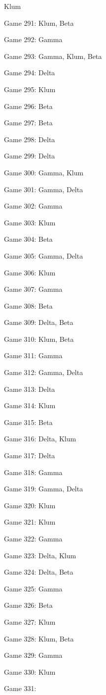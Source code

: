 \documentclass{article}
\begin{document}
\begin{multicols}{3}
\begin{compactitem}
Klum
\item Game 291:
Klum, Beta
\item Game 292:
Gamma
\item Game 293:
Gamma, Klum, Beta
\item Game 294:
Delta
\item Game 295:
Klum
\item Game 296:
Beta
\item Game 297:
Beta
\item Game 298:
Delta
\item Game 299:
Delta
\item Game 300:
Gamma, Klum
\item Game 301:
Gamma, Delta
\item Game 302:
Gamma
\item Game 303:
Klum
\item Game 304:
Beta
\item Game 305:
Gamma, Delta
\item Game 306:
Klum
\item Game 307:
Gamma
\item Game 308:
Beta
\item Game 309:
Delta, Beta
\item Game 310:
Klum, Beta
\item Game 311:
Gamma
\item Game 312:
Gamma, Delta
\item Game 313:
Delta
\item Game 314:
Klum
\item Game 315:
Beta
\item Game 316:
Delta, Klum
\item Game 317:
Delta
\item Game 318:
Gamma
\item Game 319:
Gamma, Delta
\item Game 320:
Klum
\item Game 321:
Klum
\item Game 322:
Gamma
\item Game 323:
Delta, Klum
\item Game 324:
Delta, Beta
\item Game 325:
Gamma
\item Game 326:
Beta
\item Game 327:
Klum
\item Game 328:
Klum, Beta
\item Game 329:
Gamma
\item Game 330:
Klum
\item Game 331:

\end{compactitem}
\end{multicols}
\end{document}
